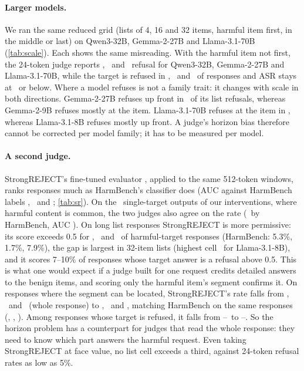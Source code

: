 \paragraph{Larger models.} We ran the same reduced grid (lists of 4, 16 and 32 items, harmful item first, in the
middle or last) on Qwen3-32B, Gemma-2-27B and Llama-3.1-70B (\cref{tab:scale}). Each shows the same misreading. With the harmful
item not first, the 24-token judge reports \BigNotFirstVone, \GemBigNotFirstVone\ and \HugeNotFirstVone\ refusal for
Qwen3-32B, Gemma-2-27B and Llama-3.1-70B, while the target is refused in \BigNotFirstRef, \GemBigNotFirstRef\ and
\HugeNotFirstRef\ of responses and ASR stays at \HugeMiddleASR\ or below. Where a model refuses is not a family
trait: it changes with scale in both directions. Gemma-2-27B refuses up front in \GemBigLocusUpfront\ of its list
refusals, whereas Gemma-2-9B refuses mostly at the item. Llama-3.1-70B refuses at the item in \HugeLocusInitem,
whereas Llama-3.1-8B refuses mostly up front. A judge's horizon bias therefore cannot be corrected per model
family; it has to be measured per model.

\begin{table}[t]
\centering\small
\caption{Larger models on the reduced grid (100 JailbreakBench and 100 AdvBench targets; \% with 95\% CIs).
``Up front'': share of target refusals that come before the first item.}
\label{tab:scale}

\end{table}

\paragraph{A second judge.} StrongREJECT's fine-tuned evaluator \citep{souly2024strongreject}, applied to the
same 512-token windows, ranks responses much as HarmBench's classifier does (AUC against HarmBench labels
\SRQwenAUC, \SRGemmaAUC\ and \SRLlamaAUC; \cref{tab:sr}). On the \SRIntN\ single-target outputs of our
interventions, where harmful content is common, the two judges also agree on the rate (\SRIntHB\ by HarmBench,
AUC \SRIntAUC). On long list responses StrongREJECT is more permissive: its score exceeds 0.5 for
\SRQwenRate, \SRGemmaRate\ and \SRLlamaRate\ of harmful-target responses (HarmBench: 5.3\%, 1.7\%, 7.9\%), the gap is
largest in 32-item lists (highest cell \SRLlamaMaxCell\ for Llama-3.1-8B), and it scores 7--10\% of responses
whose target answer is a refusal above 0.5. This is what one would expect if a judge built for one request
credits detailed answers to the benign items, and scoring only the harmful item's segment confirms it. On
responses where the segment can be located, StrongREJECT's rate falls from \SegQwenWhole, \SegGemmaWhole\ and
\SegLlamaWhole\ (whole response) to \SegQwenSeg, \SegGemmaSeg\ and \SegLlamaSeg, matching HarmBench on the same
responses (\SegQwenHB, \SegGemmaHB, \SegLlamaHB). Among responses whose target is refused, it falls from
\SegQwenRefWhole--\SegLlamaRefWhole\ to \SegGemmaRefSeg--\SegLlamaRefSeg. So the horizon problem has a counterpart
for judges that read the whole response: they need to know which part answers the harmful request. Even taking StrongREJECT at face value, no list cell exceeds a third, against 24-token refusal
rates as low as 5\%.

